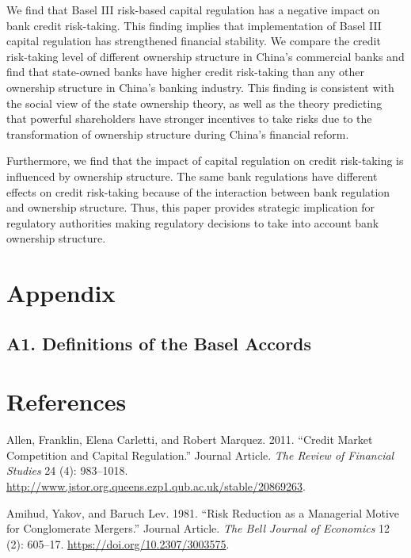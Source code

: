 \documentclass{article}
\begin{document}
We find that Basel III risk-based capital regulation has a negative
impact on bank credit risk-taking. This finding implies that
implementation of Basel III capital regulation has strengthened
financial stability. We compare the credit risk-taking level of
different ownership structure in China's commercial banks and find that
state-owned banks have higher credit risk-taking than any other
ownership structure in China's banking industry. This finding is
consistent with the social view of the state ownership theory, as well
as the theory predicting that powerful shareholders have stronger
incentives to take risks due to the transformation of ownership
structure during China's financial reform.

Furthermore, we find that the impact of capital regulation on credit
risk-taking is influenced by ownership structure. The same bank
regulations have different effects on credit risk-taking because of the
interaction between bank regulation and ownership structure. Thus, this
paper provides strategic implication for regulatory authorities making
regulatory decisions to take into account bank ownership structure.

\hypertarget{appendix}{%
\section{Appendix}\label{appendix}}

\hypertarget{a1.-definitions-of-the-basel-accords}{%
\subsection{A1. Definitions of the Basel
Accords}\label{a1.-definitions-of-the-basel-accords}}

\hypertarget{references}{%
\section*{References}\label{references}}

\hypertarget{refs}{}
\leavevmode\hypertarget{ref-RN15}{}%
Allen, Franklin, Elena Carletti, and Robert Marquez. 2011. ``Credit
Market Competition and Capital Regulation.'' Journal Article. \emph{The
Review of Financial Studies} 24 (4): 983--1018.
\url{http://www.jstor.org.queens.ezp1.qub.ac.uk/stable/20869263}.

\leavevmode\hypertarget{ref-RN16}{}%
Amihud, Yakov, and Baruch Lev. 1981. ``Risk Reduction as a Managerial
Motive for Conglomerate Mergers.'' Journal Article. \emph{The Bell
Journal of Economics} 12 (2): 605--17.
\url{https://doi.org/10.2307/3003575}.
\end{document}
